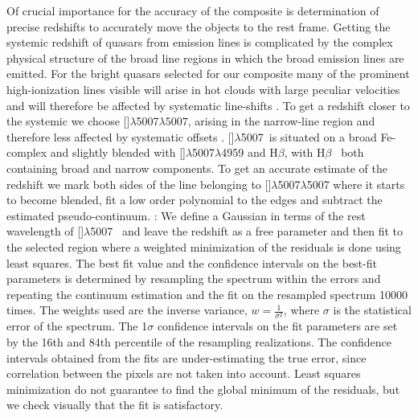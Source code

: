 \documentclass{aa}    %
\newcommand{\hb}{H$\beta$}
\newcommand{\oiii}{[\ion{O}{iii}]$\lambda$5007}
\newcommand{\todo}[3]{{\color{#2}\emph{#1}: #3}}
\newcommand{\changed}[1]{\todo{}{green}{#1}}
\begin{document}
Of crucial importance for the accuracy of the composite is determination of precise redshifts to accurately move the objects to the rest frame. Getting the systemic redshift of quasars from emission lines is complicated by the complex physical structure of the broad line regions in which the broad emission lines are emitted. For the bright quasars selected for our composite many of the prominent high-ionization lines visible will arise in hot clouds with large peculiar velocities and will therefore be affected by systematic line-shifts \citep{Tytler1992, Richards2002b, Gaskell2013}. To get a redshift closer to the systemic we choose \oiii$\lambda5007$,  arising in the narrow-line region and therefore less affected by systematic offsets \citep{Hewett2010}. \oiii~is situated on a broad Fe-complex and slightly blended with \oiii$\lambda$4959 and \hb, with \hb~ both containing broad and narrow components. 
To get an accurate estimate of the redshift we mark both sides of the line belonging to \oiii$\lambda$5007 where it starts to become blended, fit a low order polynomial to the edges and subtract the estimated pseudo-continuum. 
\changed{
We define a Gaussian in terms of the rest wavelength of \oiii~ and leave the redshift as a free parameter and then fit to the selected region where a weighted minimization of the residuals is done using least squares. The best fit value and the confidence intervals on the best-fit parameters is determined by resampling the spectrum within the errors and repeating the continuum estimation and the fit on the resampled spectrum 10000 times. The weights used are the inverse variance, $ w =  \frac{1}{\sigma^2}$, where $\sigma$ is the statistical error of the spectrum. The 1$\sigma$ confidence intervals on the fit parameters are set by the 16th and 84th percentile of the resampling realizations. The confidence intervals obtained from the fits are under-estimating the true error, since correlation between the pixels are not taken into account. Least squares minimization do not guarantee to find the global minimum of the residuals, but we check visually that the fit is satisfactory.}
\end{document}
